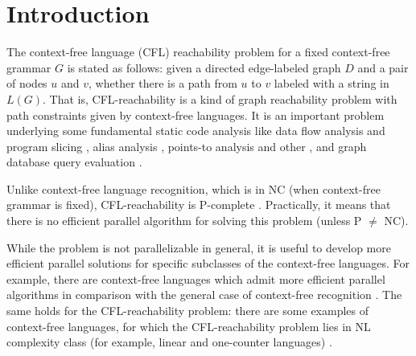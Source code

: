\documentclass{ws-ijfcs}
\begin{document}

\section{Introduction}
\label{intro}
The context-free language (CFL) reachability problem for a fixed context-free grammar $G$ is stated as follows: given a directed edge-labeled graph $D$ and a pair of nodes  $u$ and $v$, whether there is a path from $u$ to $v$ labeled with a string in $L(G)$.  That is, CFL-reachability is a kind of graph reachability problem with path constraints given by context-free languages. It is an important problem underlying some fundamental static code analysis like data flow analysis and program slicing \cite{RepsBasic}, alias analysis \cite*{Chatterjee, alias}, points-to analysis \cite{Incremental} and other \cite{Cai, android, typeflow}, and graph database query evaluation \cite{Azimov, GrigorevRagozina, HellingsCFPQ, RDF}.


Unlike context-free language recognition, which is in NC (when context-free grammar is fixed), CFL-reachability is P-complete \cite{ RepSeq, Yannakakis}. Practically, it means that there is no efficient parallel algorithm for solving this problem (unless P $\neq$ NC). 


While the problem is not parallelizable in general, it is useful to develop more efficient parallel solutions for specific subclasses of the context-free languages. For example, there are context-free languages which admit more efficient parallel algorithms in comparison with the general case of context-free recognition \cite{IBARRA2, IBARRA, Okhotin2014ComplexityOI}.  The same holds for the CFL-reachability problem: there are some examples of context-free languages, for which the CFL-reachability problem lies in NL complexity class (for example, linear and one-counter languages) \cite{labelledGraphs, LReach, Regularrealizability}. 
\end{document}
